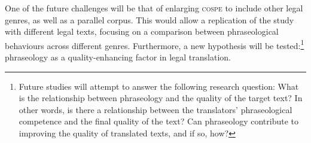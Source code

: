 \documentclass[output=paper]{LSP/langsci}
\begin{document}
One of the future challenges will be that of enlarging \textsc{cospe} to include other legal genres, as well as a parallel corpus. This would allow a replication of the study with different legal texts, focusing on a comparison between phraseological behaviours across different genres. Furthermore, a new hypothesis will be tested:\footnote{Future studies will attempt to answer the following research question: What is the relationship between phraseology and the quality of the target text? In other words, is there a relationship between the translators’ phraseological competence and the final quality of the text? Can phraseology contribute to improving the quality of translated texts, and if so, how?} phraseology as a quality-enhancing factor in legal translation.




\printbibliography[heading=subbibliography,notkeyword=this]
\end{document}
